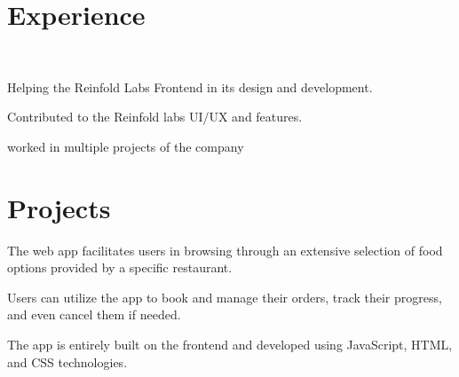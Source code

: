 \documentclass[]{deedy-resume-openfont}
\begin{document}
\hfill
\begin{minipage}[t]{0.66\textwidth} 


\section{Experience}

\sectionsep\\
\vspace{\topsep} %
\begin{tightemize}
\item Helping the Reinfold Labs Frontend in its design and development.
\item Contributed to the Reinfold labs UI/UX and features.
\item worked in multiple projects of the company
\end{tightemize}
\sectionsep


\section{Projects}
\vspace{\topsep} %
\begin{tightemize}
\item The web app facilitates users in browsing through an extensive selection of food options provided by a specific restaurant.
\item Users can utilize the app to book and manage their orders, track their progress, and even cancel them if needed.
\item The app is entirely built on the frontend and developed using JavaScript, HTML, and CSS technologies.
\end{tightemize}
\sectionsep


\end{minipage}
\end{document}
